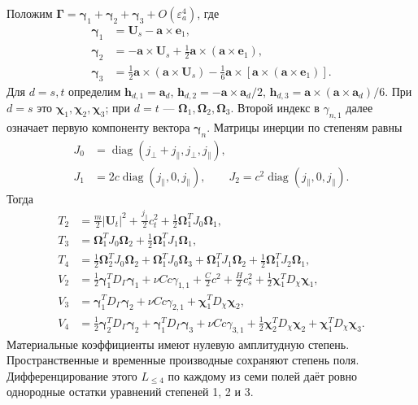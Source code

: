 \documentclass[11pt,a4paper]{article}
\newcommand{\Gam}{\boldsymbol\Gamma}
\newcommand{\Om}{\boldsymbol\Omega}
\newcommand{\Chi}{\boldsymbol\chi}
\newcommand{\eone}{\mathbf e_1}
\begin{document}
Положим $\Gam=\boldsymbol\gamma_1+\boldsymbol\gamma_2+\boldsymbol\gamma_3+O(\varepsilon_a^4)$, где
\[
\begin{aligned}
\boldsymbol\gamma_1&=\mathbf U_s-\mathbf a\times\eone,\\
\boldsymbol\gamma_2&=-\mathbf a\times\mathbf U_s+\tfrac12\mathbf a\times(\mathbf a\times\eone),\\
\boldsymbol\gamma_3&=\tfrac12\mathbf a\times(\mathbf a\times\mathbf U_s)
-\tfrac16\mathbf a\times[\mathbf a\times(\mathbf a\times\eone)].
\end{aligned}
\]
Для $d=s,t$ определим $\mathbf h_{d,1}=\mathbf a_d$, $\mathbf h_{d,2}=-\mathbf a\times\mathbf a_d/2$, $\mathbf h_{d,3}=\mathbf a\times(\mathbf a\times\mathbf a_d)/6$. При $d=s$ это $\Chi_1,\Chi_2,\Chi_3$; при $d=t$ --- $\Om_1,\Om_2,\Om_3$. Второй индекс в $\gamma_{n,1}$ далее означает первую компоненту вектора $\boldsymbol\gamma_n$. Матрицы инерции по степеням равны
\[
\begin{aligned}
J_0&=\operatorname{diag}(j_\perp+j_\parallel,j_\perp,j_\parallel),\\
J_1&=2c\operatorname{diag}(j_\parallel,0,j_\parallel),\qquad
J_2=c^2\operatorname{diag}(j_\parallel,0,j_\parallel).
\end{aligned}
\]
Тогда
\[
\begin{aligned}
T_2&=\tfrac m2|\mathbf U_t|^2+\tfrac{j_\parallel}{2}c_t^2+\tfrac12\Om_1^TJ_0\Om_1,\\
T_3&=\Om_1^TJ_0\Om_2+\tfrac12\Om_1^TJ_1\Om_1,\\
T_4&=\tfrac12\Om_2^TJ_0\Om_2+\Om_1^TJ_0\Om_3
+\Om_1^TJ_1\Om_2+\tfrac12\Om_1^TJ_2\Om_1,\\[2pt]
V_2&=\tfrac12\boldsymbol\gamma_1^TD_\Gamma\boldsymbol\gamma_1
+\nu Cc\gamma_{1,1}+\tfrac C2c^2+\tfrac H2c_s^2+\tfrac12\Chi_1^TD_\chi\Chi_1,\\
V_3&=\boldsymbol\gamma_1^TD_\Gamma\boldsymbol\gamma_2+\nu Cc\gamma_{2,1}
+\Chi_1^TD_\chi\Chi_2,\\
V_4&=\tfrac12\boldsymbol\gamma_2^TD_\Gamma\boldsymbol\gamma_2
+\boldsymbol\gamma_1^TD_\Gamma\boldsymbol\gamma_3+\nu Cc\gamma_{3,1}
+\tfrac12\Chi_2^TD_\chi\Chi_2+\Chi_1^TD_\chi\Chi_3.
\end{aligned}
\]
Материальные коэффициенты имеют нулевую амплитудную степень. Пространственные и временные производные сохраняют степень поля. Дифференцирование этого $L_{\leq4}$ по каждому из семи полей даёт ровно однородные остатки уравнений степеней 1, 2 и 3.
\end{document}
